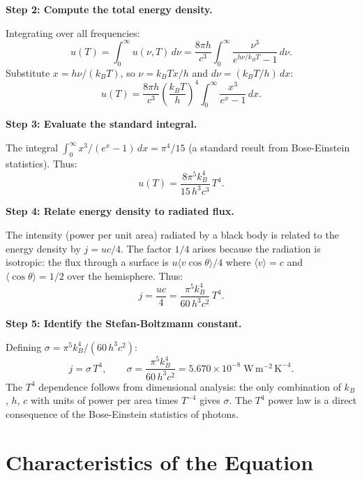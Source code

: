 \textbf{Step 2: Compute the total energy density.}

Integrating over all frequencies:
\begin{equation}
u(T) = \int_0^\infty u(\nu,T)\,d\nu = \frac{8\pi h}{c^3}\int_0^\infty \frac{\nu^3}{e^{h\nu/k_BT} - 1}\,d\nu.
\end{equation}
Substitute $x = h\nu/(k_BT)$, so $\nu = k_BTx/h$ and $d\nu = (k_BT/h)\,dx$:
\begin{equation}
u(T) = \frac{8\pi h}{c^3}\left(\frac{k_BT}{h}\right)^4\int_0^\infty \frac{x^3}{e^x - 1}\,dx.
\end{equation}

\textbf{Step 3: Evaluate the standard integral.}

The integral $\int_0^\infty x^3/(e^x - 1)\,dx = \pi^4/15$ (a standard result from Bose-Einstein statistics). Thus:
\begin{equation}
u(T) = \frac{8\pi^5 k_B^4}{15\,h^3 c^3}\,T^4.
\end{equation}

\textbf{Step 4: Relate energy density to radiated flux.}

The intensity (power per unit area) radiated by a black body is related to the energy density by $j = uc/4$. The factor $1/4$ arises because the radiation is isotropic: the flux through a surface is $u\langle v\cos\theta\rangle/4$ where $\langle v\rangle = c$ and $\langle\cos\theta\rangle = 1/2$ over the hemisphere. Thus:
\begin{equation}
j = \frac{uc}{4} = \frac{\pi^5 k_B^4}{60\,h^3 c^2}\,T^4.
\end{equation}

\textbf{Step 5: Identify the Stefan-Boltzmann constant.}

Defining $\sigma = \pi^5 k_B^4/(60\,h^3 c^2)$:
\begin{equation}
\boxed{j = \sigma\,T^4, \qquad \sigma = \frac{\pi^5 k_B^4}{60\,h^3 c^2} = 5.670 \times 10^{-8}\;\text{W}\,\text{m}^{-2}\,\text{K}^{-4}.}
\end{equation}
The $T^4$ dependence follows from dimensional analysis: the only combination of $k_B$, $h$, $c$ with units of power per area times $T^{-4}$ gives $\sigma$. The $T^4$ power law is a direct consequence of the Bose-Einstein statistics of photons.

\section*{Characteristics of the Equation}

